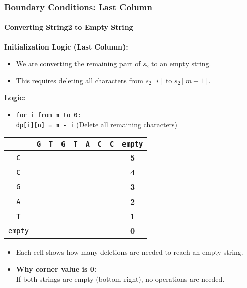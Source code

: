 \documentclass[10pt,aspectratio=43]{beamer}
\begin{document}
\begin{frame}
\frametitle{Boundary Conditions: Last Column}
\framesubtitle{Converting String2 to Empty String}

\textbf{Initialization Logic (Last Column):}
\begin{itemize}
    \item We are converting the remaining part of $s_2$ to an empty string.
    \item This requires deleting all characters from $s_2[i]$ to $s_2[m-1]$.
\end{itemize}

\vspace{0.2cm}
\textbf{Logic:}
\begin{itemize}
    \item \texttt{for i from m to 0:} \\
    \quad \texttt{dp[i][n] = m - i} \hfill (Delete all remaining characters)
\end{itemize}

\vspace{0.2cm}
\begin{center}
\scriptsize
\begin{tabular}{|c|c|c|c|c|c|c|c|c|}
    \hline
    & \texttt{G} & \texttt{T} & \texttt{G} & \texttt{T} & \texttt{A} & \texttt{C} & \texttt{C} & \texttt{empty} \\ \hline
    \texttt{C} &  &  &  &  &  &  &  & \textbf{5} \\ \hline
    \texttt{C} &  &  &  &  &  &  &  & \textbf{4} \\ \hline
    \texttt{G} &  &  &  &  &  &  &  & \textbf{3} \\ \hline
    \texttt{A} &  &  &  &  &  &  &  & \textbf{2} \\ \hline
    \texttt{T} &  &  &  &  &  &  &  & \textbf{1} \\ \hline
    \texttt{empty} &  &  &  &  &  &  &  & \textbf{0} \\ \hline
\end{tabular}
\end{center}

\vspace{0.2cm}
\begin{itemize}
    \item Each cell shows how many deletions are needed to reach an empty string.
    \item \textbf{Why corner value is 0:} \\
    \quad If both strings are empty (bottom-right), no operations are needed.
\end{itemize}
\end{frame}
\end{document}
